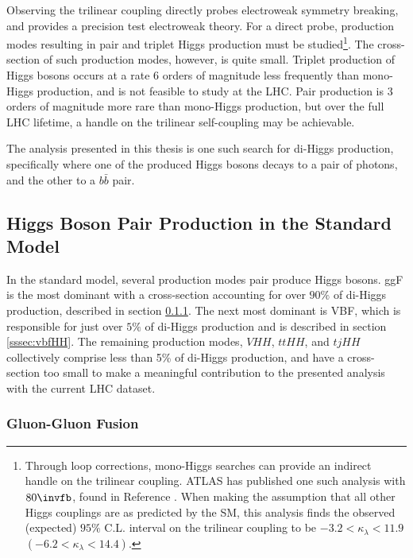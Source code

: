 Observing the trilinear coupling directly probes electroweak symmetry breaking, and provides a precision test electroweak theory. For a direct probe, production modes resulting in pair and triplet Higgs production must be studied\footnote{Through loop corrections, mono-Higgs searches can provide an indirect handle on the trilinear coupling. ATLAS has published one such analysis with $\unit{80}{\invfb}$, found in Reference \cite{monohiggs-selfcoupling}. When making the assumption that all other Higgs couplings are as predicted by the \gls{SM}, this analysis finds the observed (expected) $95\%$ C.L. interval on the trilinear coupling to be $-3.2 < \kappa_\lambda <11.9$   $(-6.2 < \kappa_\lambda <14.4)$.}. The cross-section of such production modes, however, is quite small. Triplet production of Higgs bosons occurs at a rate 6 orders of magnitude less frequently than mono-Higgs production, and is not feasible to study at the \gls{LHC}. Pair production is 3 orders of magnitude more rare than mono-Higgs production, but over the full \gls{LHC} lifetime, a handle on the trilinear self-coupling may be achievable.

The analysis presented in this thesis is one such search for di-Higgs production, specifically where one of the produced Higgs bosons decays to a pair of photons, and the other to a $b\bar{b}$ pair.

\subsection{Higgs Boson Pair Production in the Standard Model}
In the standard model, several production modes pair produce Higgs bosons. \gls{ggF} is the most dominant with a cross-section accounting for over $90\%$ of di-Higgs production, described in section \ref{sssec:ggfHH}. The next most dominant is \gls{VBF}, which is responsible for just over $5\%$ of di-Higgs production and is described in section \ref{sssec:vbfHH}. The remaining production modes, $VHH$, $ttHH$, and $tjHH$ collectively comprise less than 5\% of di-Higgs production, and have a cross-section too small to make a meaningful contribution to the presented analysis with the current \gls{LHC} dataset.

\subsubsection{Gluon-Gluon Fusion} \label{sssec:ggfHH}

